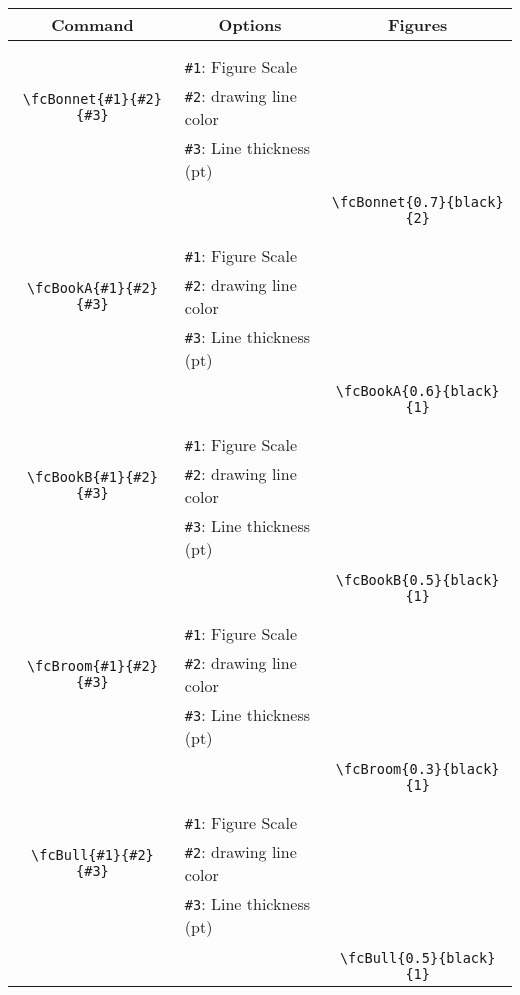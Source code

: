 \documentclass[x11names]{article}
\begin{document}
\begin{table}[H]\centering\begin{tabular}{|c|l|c|}\hline {\bf Command}& \multicolumn{1}{c|}{{\bf Options}} & {\bf Figures}\\  \hline	&&\multirow{5}{*}{\fcBonnet{0.7}{black}{2}}\\	&&\\	&\verb|#1|: Figure Scale &\\	\verb|\fcBonnet{#1}{#2}{#3}|&	\verb|#2|: drawing line color &\\	&\verb|#3|: Line thickness (pt) &\\ &&\\&&	\verb|\fcBonnet{0.7}{black}{2}|\\\hline 	
	&&\multirow{5}{*}{\fcBookA{0.6}{black}{1}}\\	&&\\	&\verb|#1|: Figure Scale &\\	\verb|\fcBookA{#1}{#2}{#3}|&	\verb|#2|: drawing line color &\\	&\verb|#3|: Line thickness (pt) &\\ &&\\&&	\verb|\fcBookA{0.6}{black}{1}|\\\hline 	
	&&\multirow{5}{*}{\fcBookB{0.5}{black}{1}}\\	&&\\	&\verb|#1|: Figure Scale &\\	\verb|\fcBookB{#1}{#2}{#3}|&	\verb|#2|: drawing line color &\\	&\verb|#3|: Line thickness (pt) &\\ &&\\&&	\verb|\fcBookB{0.5}{black}{1}|\\\hline 	
	&&\multirow{5}{*}{\fcBroom{0.3}{black}{1}}\\	&&\\	&\verb|#1|: Figure Scale &\\	\verb|\fcBroom{#1}{#2}{#3}|&	\verb|#2|: drawing line color &\\	&\verb|#3|: Line thickness (pt) &\\ &&\\&&	\verb|\fcBroom{0.3}{black}{1}|\\\hline 	
	&&\multirow{5}{*}{\fcBull{0.5}{black}{1}}\\	&&\\	&\verb|#1|: Figure Scale &\\	\verb|\fcBull{#1}{#2}{#3}|&	\verb|#2|: drawing line color &\\	&\verb|#3|: Line thickness (pt) &\\ &&\\&&	\verb|\fcBull{0.5}{black}{1}|\\\hline 	

\end{tabular}
\end{table}
\end{document}
